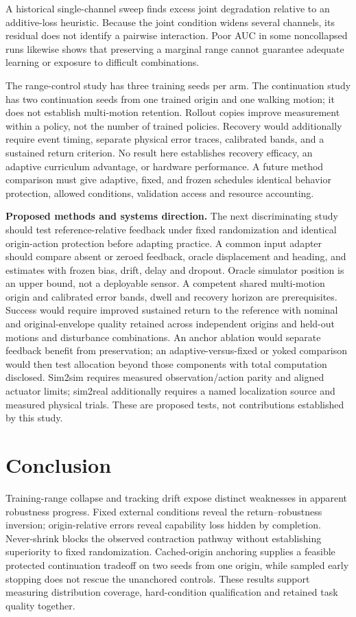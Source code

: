 \documentclass[letterpaper,10pt,conference]{ieeeconf}
\begin{document}
A historical single-channel sweep finds excess joint degradation relative to an additive-loss heuristic. Because the joint condition widens several channels, its residual does not identify a pairwise interaction. Poor AUC in some noncollapsed runs likewise shows that preserving a marginal range cannot guarantee adequate learning or exposure to difficult combinations.

The range-control study has three training seeds per arm. The continuation study has two continuation seeds from one trained origin and one walking motion; it does not establish multi-motion retention. Rollout copies improve measurement within a policy, not the number of trained policies. Recovery would additionally require event timing, separate physical error traces, calibrated bands, and a sustained return criterion. No result here establishes recovery efficacy, an adaptive curriculum advantage, or hardware performance. A future method comparison must give adaptive, fixed, and frozen schedules identical behavior protection, allowed conditions, validation access and resource accounting.

\textbf{Proposed methods and systems direction.} The next discriminating study should test reference-relative feedback under fixed randomization and identical origin-action protection before adapting practice. A common input adapter should compare absent or zeroed feedback, oracle displacement and heading, and estimates with frozen bias, drift, delay and dropout. Oracle simulator position is an upper bound, not a deployable sensor. A competent shared multi-motion origin and calibrated error bands, dwell and recovery horizon are prerequisites. Success would require improved sustained return to the reference with nominal and original-envelope quality retained across independent origins and held-out motions and disturbance combinations. An anchor ablation would separate feedback benefit from preservation; an adaptive-versus-fixed or yoked comparison would then test allocation beyond those components with total computation disclosed. Sim2sim requires measured observation/action parity and aligned actuator limits; sim2real additionally requires a named localization source and measured physical trials. These are proposed tests, not contributions established by this study.

\section{Conclusion}

Training-range collapse and tracking drift expose distinct weaknesses in apparent robustness progress. Fixed external conditions reveal the return--robustness inversion; origin-relative errors reveal capability loss hidden by completion. Never-shrink blocks the observed contraction pathway without establishing superiority to fixed randomization. Cached-origin anchoring supplies a feasible protected continuation tradeoff on two seeds from one origin, while sampled early stopping does not rescue the unanchored controls. These results support measuring distribution coverage, hard-condition qualification and retained task quality together.
\end{document}
